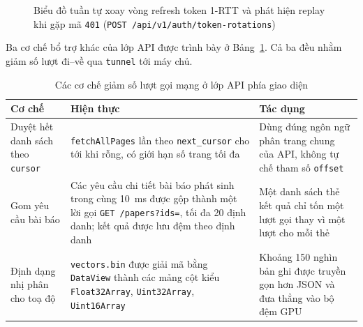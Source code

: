 \begin{figure}[htbp]
{%
}
\caption{Biểu đồ tuần tự xoay vòng refresh token 1-RTT và phát hiện replay khi gặp mã \texttt{401} (\texttt{POST /api/v1/auth/token-rotations})}
\label{fig:flow03-seq-rotation}
\end{figure}

Ba cơ chế bổ trợ khác của lớp API được trình bày ở Bảng~\ref{tab:fe-co-che-api}. Cả ba đều nhằm giảm số lượt đi--về qua \texttt{tunnel} tới máy chủ.

\begin{table}[htbp]
\centering
\caption{Các cơ chế giảm số lượt gọi mạng ở lớp API phía giao diện}
\label{tab:fe-co-che-api}
\footnotesize
\setlength{\tabcolsep}{4pt}
\begin{tabularx}{\textwidth}{
  >{\raggedright\arraybackslash}p{3.0cm}
  >{\raggedright\arraybackslash}p{5.2cm}
  >{\raggedright\arraybackslash}X
}
\toprule
\textbf{Cơ chế} & \textbf{Hiện thực} & \textbf{Tác dụng} \\
\midrule
Duyệt hết danh sách theo \texttt{cursor} & \texttt{fetchAllPages} lần theo \texttt{next\_\allowbreak{}cursor} cho tới khi rỗng, có giới hạn số trang tối đa & Dùng đúng ngôn ngữ phân trang chung của API, không tự chế tham số \texttt{offset} \\
\midrule
Gom yêu cầu bài báo & Các yêu cầu chi tiết bài báo phát sinh trong cùng 10~ms được gộp thành một lời gọi \texttt{GET /papers?ids=}, tối đa 20 định danh; kết quả được lưu đệm theo định danh & Một danh sách thẻ kết quả chỉ tốn một lượt gọi thay vì một lượt cho mỗi thẻ \\
\midrule
Định dạng nhị phân cho toạ độ & \texttt{vectors.bin} được giải mã bằng \texttt{DataView} thành các mảng cột kiểu \texttt{Float32Array}, \texttt{Uint32Array}, \texttt{Uint16Array} & Khoảng 150 nghìn bản ghi được truyền gọn hơn JSON và đưa thẳng vào bộ đệm GPU \\
\bottomrule
\end{tabularx}
\end{table}

